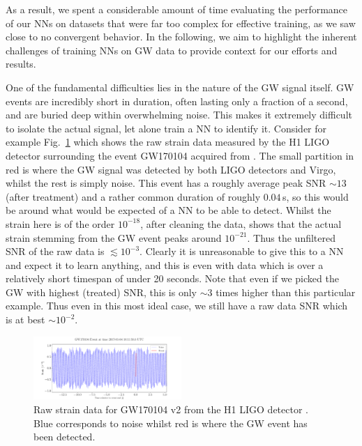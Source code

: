 \documentclass[%
reprint,
amsmath,amssymb,
aps,
]{revtex4-2}
\begin{document}
As a result, we spent a considerable amount of time evaluating the performance of our NNs on datasets that were far too complex for effective training, as we saw close to no convergent behavior. In the following, we aim to highlight the inherent challenges of training NNs on GW data to provide context for our efforts and results. 

One of the fundamental difficulties lies in the nature of the GW signal itself. GW events are incredibly short in duration, often lasting only a fraction of a second, and are buried deep within overwhelming noise. This makes it extremely difficult to isolate the actual signal, let alone train a NN to identify it. Consider for example Fig.~\ref{fig:GW170104} which shows the raw strain data measured by the H1 LIGO detector surrounding the event GW170104 acquired from \cite{gwosc}. The small partition in red is where the GW signal was detected by both LIGO detectors and Virgo, whilst the rest is simply noise. This event has a roughly average peak SNR $\sim13$ (after treatment) and a rather common duration of roughly $0.04\,$s, so this would be around what would be expected of a NN to be able to detect. Whilst the strain here is of the order $10^{-18}$, after cleaning the data, \cite{LIGOScientific:2017bnn} shows that the actual strain stemming from the GW event peaks around $10^{-21}$. Thus the unfiltered SNR of the raw data is $\lesssim10^{-3}$. Clearly it is unreasonable to give this to a NN and expect it to learn anything, and this is even with data which is over a relatively short timespan of under 20 seconds. Note that even if we picked the GW with highest (treated) SNR, this is only $\sim3$ times higher than this particular example. Thus even in this most ideal case, we still have a raw data SNR which is at best $\sim10^{-2}$.

\begin{figure}[H]
	\includegraphics[width=0.5\textwidth]{Figures/GW170104GWEvent.pdf}
	\caption{Raw strain data for GW170104 v2 from the H1 LIGO detector \cite{gwosc}. Blue corresponds to noise whilst red is where the GW event has been detected.}
	\label{fig:GW170104}
\end{figure}
\end{document}
